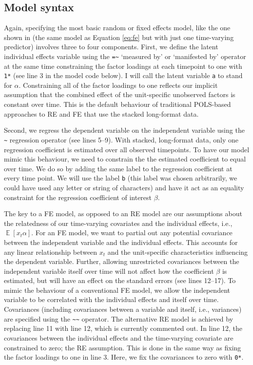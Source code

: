 \documentclass[]{interact}
\theoremstyle{plain}%
\theoremstyle{definition}
\theoremstyle{remark}
\begin{document}
\hypertarget{model-syntax}{%
\subsection{Model syntax}\label{model-syntax}}

Again, specifying the most basic random or fixed effects model, like the
one shown in \citet{Bollen2010} (the same model as Equation
\eqref{eq:fe} but with just one time-varying predictor) involves three
to four components. First, we define the latent individual effects
variable using the \texttt{=\textasciitilde{}} `measured by' or
`manifested by' \citep{R-lavaan} operator at the same time constraining
the factor loadings at each timepoint to one with \texttt{1*} (see line
3 in the model code below). I will call the latent variable \texttt{a}
to stand for \(\alpha\). Constraining all of the factor loadings to one
reflects our implicit assumption that the combined effect of the
unit-specific unobserved factors is constant over time. This is the
default behaviour of traditional POLS-based approaches to RE and FE that
use the stacked long-format data.

Second, we regress the dependent variable on the independent variable
using the \texttt{\textasciitilde{}} regression operator (see lines
5--9). With stacked, long-format data, only one regression coefficient
is estimated over all observed timepoints. To have our model mimic this
behaviour, we need to constrain the the estimated coefficient to equal
over time. We do so by adding the same label to the regression
coefficient at every time point. We will use the label \texttt{b} (this
label was chosen arbitrarily, we could have used any letter or string of
characters) and have it act as an equality constraint for the regression
coefficient of interest \(\beta\).

The key to a FE model, as opposed to an RE model are our assumptions
about the relatedness of our time-varying covariates and the individual
effects, i.e., \(\mathop{\mathrm{\mathbb{E}}}[x_{t}\alpha]\). For an FE
model, we want to partial out any potential covariance between the
independent variable and the individual effects. This accounts for any
linear relationship between \(x_{t}\) and the unit-specific
characteristics influencing the dependent variable. Further, allowing
unrestricted covariances between the independent variable itself over
time will not affect how the coefficient \(\beta\) is estimated, but
will have an effect on the standard errors (see lines 12--17). To mimic
the behaviour of a conventional FE model, we allow the independent
variable to be correlated with the individual effects and itself over
time. Covariances (including covariances between a variable and itself,
i.e., variances) are specified using the
\texttt{\textasciitilde{}\textasciitilde{}} operator. The alternative RE
model is achieved by replacing line 11 with line 12, which is currently
commented out. In line 12, the covariances between the individual
effects and the time-varying covariate are constrained to zero; the RE
assumption. This is done in the same way as fixing the factor loadings
to one in line 3. Here, we fix the covariances to zero with \texttt{0*}.
\end{document}
